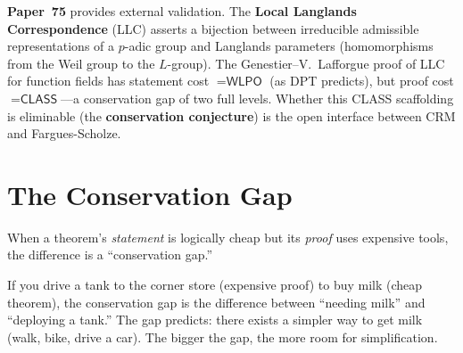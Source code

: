 \documentclass[11pt,twoside,openany]{report}
\theoremstyle{remark}
\newcommand{\WLPO}{\textsf{WLPO}}
\newcommand{\CLASS}{\textsf{CLASS}}
\newcommand{\paperref}[1]{\textbf{Paper~#1}}
\begin{document}
\paperref{75} provides external validation. The \textbf{Local Langlands Correspondence} (LLC) asserts a bijection between irreducible admissible representations of a $p$-adic group and Langlands parameters (homomorphisms from the Weil group to the $L$-group). The Genestier--V.~Lafforgue proof of LLC for function fields has statement cost $= \WLPO$ (as DPT predicts), but proof cost $= \CLASS$---a conservation gap of two full levels. Whether this \CLASS{} scaffolding is eliminable (the \textbf{conservation conjecture}) is the open interface between CRM and Fargues-Scholze.


\section{The Conservation Gap}

When a theorem's \emph{statement} is logically cheap but its \emph{proof} uses expensive tools, the difference is a ``conservation gap.''

\begin{analogybox}
If you drive a tank to the corner store (expensive proof) to buy milk (cheap theorem), the conservation gap is the difference between ``needing milk'' and ``deploying a tank.'' The gap predicts: there exists a simpler way to get milk (walk, bike, drive a car). The bigger the gap, the more room for simplification.
\end{analogybox}
\end{document}

